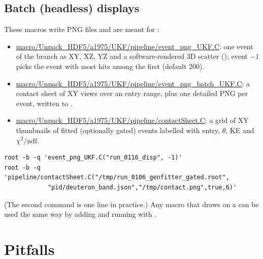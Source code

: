 \subsection{Batch (headless) displays}
\label{sec:vis-batch}

These macros write PNG files and are meant for :
\begin{itemize}
  \item \url{macro/Unpack_HDF5/a1975/UKF/pipeline/event_png_UKF.C}: one event of the
         branch as XY, XZ, YZ and a software-rendered 3D scatter
        (); event $-1$ picks the event with most hits among the first
         (default 200).
  \item \url{macro/Unpack_HDF5/a1975/UKF/pipeline/event_png_batch_UKF.C}: a contact sheet of
        XY views over an entry range, plus one detailed PNG per event, written to
        .
  \item \url{macro/Unpack_HDF5/a1975/UKF/pipeline/contactSheet.C}: a grid of XY thumbnails of
        fitted (optionally gated) events labelled with entry, $\theta$, KE and
        $\chi^2/\mathrm{ndf}$.
\end{itemize}
\begin{verbatim}
root -b -q 'event_png_UKF.C("run_0116_disp", -1)'
root -b -q 'pipeline/contactSheet.C("/tmp/run_0106_genfitter_gated.root",
            "pid/deuteron_band.json","/tmp/contact.png",true,6)'
\end{verbatim}
(The second command is one line in practice.) Any macro that draws on a  can be
used the same way by adding  and running with .

\section{Pitfalls}
\label{sec:vis-pitfalls}

